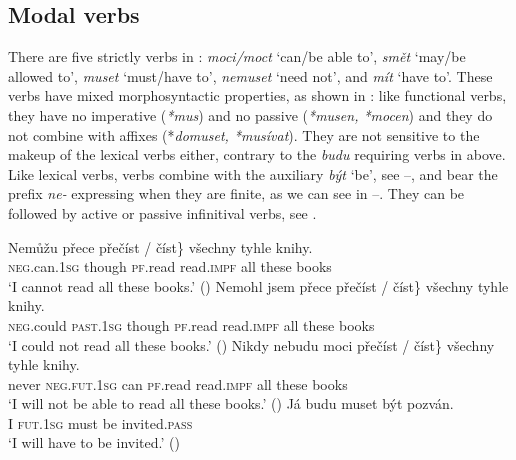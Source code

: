 \documentclass[output=paper,colorlinks,citecolor=brown,]{langsci/langscibook}
\begin{document}
\subsection{Modal verbs} \label{sec:3.2}
There are five strictly  verbs in : \textit{moci/moct} `can/be able to', \textit{smět} `may/be allowed to', \textit{muset} `must/have to', \textit{nemuset} `need not', and \textit{mít} `have to'. These verbs have mixed morphosyntactic properties, as shown in \cite{Kyncl2008}: like functional verbs, they have no imperative (\textit{*mus}) and no passive (\textit{*musen, *mocen}) and they do not combine with  affixes (*\textit{domuset, *musívat}). They are not sensitive to the  makeup of the lexical verbs either, contrary to the  \textit{budu} requiring  verbs in  above. Like lexical verbs,  verbs combine with the auxiliary \textit{být} `be', see --, and bear the prefix \textit{ne-} expressing  when they are finite, as we can see in --. They can be followed by active or passive infinitival verbs, see .

\begin{exe}
\ex \label{14}
\begin{xlist}
\ex \label{14a}\gll Nemůžu přece \minsp{\{} přečíst  / číst\} všechny tyhle knihy. \\
\textsc{neg}.can.\textsc{1sg} though {} \textsc{pf}.read {}  read.\textsc{impf} all these books \\
\glt `I cannot read all these books.'  \hfill ()
\ex \label{14b}\gll Nemohl jsem přece \minsp{\{} přečíst / číst\} všechny tyhle knihy.\\
\textsc{neg}.could  \textsc{past}.\textsc{1sg} though {} \textsc{pf}.read {}  read.\textsc{impf} all  these books\\
\glt `I could not read all these books.'  \hfill ()
\ex \label{14c}\gll Nikdy  nebudu moci  \minsp{\{} přečíst  / číst\} všechny tyhle  knihy. \\
never \textsc{neg}.\textsc{fut}.\textsc{1sg} can {} \textsc{pf}.read {} read.\textsc{impf} all these books \\
\glt `I will not be able to read all these books.'   \hfill ()
\ex \label{14d} \gll Já budu muset být pozván.\\
I   \textsc{fut}.\textsc{1sg}  must  be   invited.\textsc{pass} \\
\glt  `I will have to be invited.'   \hfill ()
\end{xlist}
\end{exe}
\end{document}
